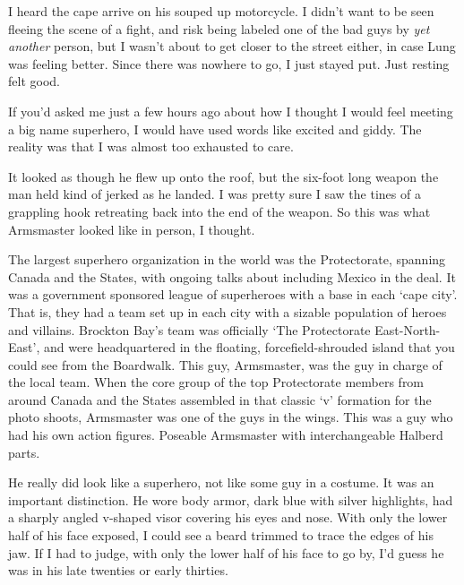 





I heard the cape arrive on his souped up motorcycle.  I didn't want to be seen fleeing the scene of a fight, and risk being labeled one of the bad guys by \emph{yet another} person, but I wasn't about to get closer to the street either, in case Lung was feeling better.  Since there was nowhere to go, I just stayed put.  Just resting felt good.



If you'd asked me just a few hours ago about how I thought I would feel meeting a big name superhero, I would have used words like excited and giddy.  The reality was that I was almost too exhausted to care.



It looked as though he flew up onto the roof, but the six-foot long weapon the man held kind of jerked as he landed.  I was pretty sure I saw the tines of a grappling hook retreating back into the end of the weapon.  So this was what Armsmaster looked like in person, I thought.



The largest superhero organization in the world was the Protectorate, spanning Canada and the States, with ongoing talks about including Mexico in the deal.  It was a government sponsored league of superheroes with a base in each `cape city'.  That is, they had a team set up in each city with a sizable population of heroes and villains.  Brockton Bay's team was officially `The Protectorate East-North-East', and were headquartered in the floating, forcefield-shrouded island that you could see from the Boardwalk.  This guy, Armsmaster, was the guy in charge of the local team.  When the core group of the top Protectorate members from around Canada and the States assembled in that classic `v' formation for the photo shoots, Armsmaster was one of the guys in the wings.  This was a guy who had his own action figures.  Poseable Armsmaster with interchangeable Halberd parts.



He really did look like a superhero, not like some guy in a costume.  It was an important distinction.  He wore body armor, dark blue with silver highlights, had a sharply angled v-shaped visor covering his eyes and nose.  With only the lower half of his face exposed, I could see a beard trimmed to trace the edges of his jaw.  If I had to judge, with only the lower half of his face to go by, I'd guess he was in his late twenties or early thirties.



